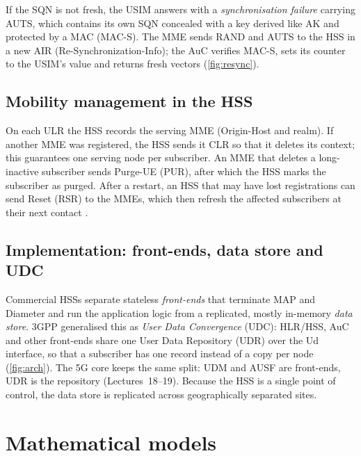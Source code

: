 \documentclass[11pt,a4paper]{article}
\begin{document}
If the SQN is not fresh, the USIM answers with a \emph{synchronisation failure} carrying AUTS, which
contains its own SQN concealed with a key derived like AK and protected by a MAC (MAC-S). The MME sends
RAND and AUTS to the HSS in a new AIR (Re-Synchronization-Info); the AuC verifies MAC-S, sets its
counter to the USIM's value and returns fresh vectors (\cref{fig:resync}).

\subsection{Mobility management in the HSS}
On each ULR the HSS records the serving MME (Origin-Host and realm). If another MME was registered, the
HSS sends it CLR so that it deletes its context; this guarantees one serving node per subscriber. An MME
that deletes a long-inactive subscriber sends Purge-UE (PUR), after which the HSS marks the subscriber as
purged. After a restart, an HSS that may have lost registrations can send Reset (RSR) to the MMEs, which
then refresh the affected subscribers at their next contact \cite{ts29272}.

\subsection{Implementation: front-ends, data store and UDC}
Commercial HSSs separate stateless \emph{front-ends} that terminate MAP and Diameter and run the
application logic from a replicated, mostly in-memory \emph{data store}. 3GPP generalised this as
\emph{User Data Convergence} (UDC): HLR/HSS, AuC and other front-ends share one User Data Repository
(UDR) over the Ud interface, so that a subscriber has one record instead of a copy per node
(\cref{fig:arch}). The 5G core keeps the same split: UDM and AUSF are front-ends, UDR is the repository
(Lectures~18--19). Because the HSS is a single point of control, the data store is replicated across
geographically separated sites.

\begin{acnfigure}
  \caption{Functional view of the HSS with its interfaces and the front-end/data-store split.}
  \label{fig:arch}
\end{acnfigure}

\section{Mathematical models}
\end{document}
